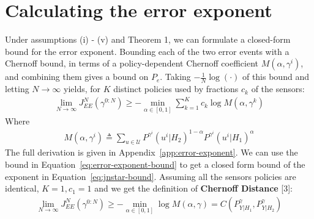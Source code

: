 \documentclass[11pt]{article}
\newcommand{\JNEE}{J^N_{EE}(\gamma^{0:N})}
\begin{document}
\section{Calculating the error exponent}
\label{sec:error-exponent}
Under assumptions (i) - (v) and Theorem 1, we can formulate a closed-form bound for the error exponent. 
Bounding each of the two error events with a Chernoff bound, in terms of a policy-dependent Chernoff coefficient 
$M(\alpha,\gamma^i)$, and combining them gives a bound on $P_e$. Taking $-\frac{1}{N}\log(\cdot)$ of this bound and letting $N \to \infty$ yields, 
for $K$ distinct policies used by fractions $c_k$ of the sensors:
\begin{align}
    \lim_{N \to \infty}\JNEE \geq -\min_{\alpha \in [0,1]}\sum_{k=1}^{K} c_k \log M(\alpha,\gamma^k) \label{eq:error-exponent-bound}
\end{align}
Where
\begin{align}
    M(\alpha,\gamma^i) \triangleq \sum_{u \in \mathcal{U}} P^{\gamma^i}(u^i|H_2)^{1-\alpha}P^{\gamma^i}(u^i|H_1)^{\alpha}
\end{align}
The full derivation is given in Appendix~\ref{app:error-exponent}.\newline
We can use the bound in Equation~\eqref{eq:error-exponent-bound} to get a closed form bound of the exponent in Equation~\eqref{eq:jnstar-bound}. Assuming all the sensors policies are identical,
$K = 1, c_1 = 1$ and we get the definition of \textbf{Chernoff Distance} [3]:
\begin{align*}
    \lim_{N \to \infty}\JNEE \geq -\min_{\alpha \in [0,1]}\log M(\alpha,\gamma) = C(P^\gamma_{Y|H_1},P^\gamma_{Y|H_2})
\end{align*}
\end{document}
